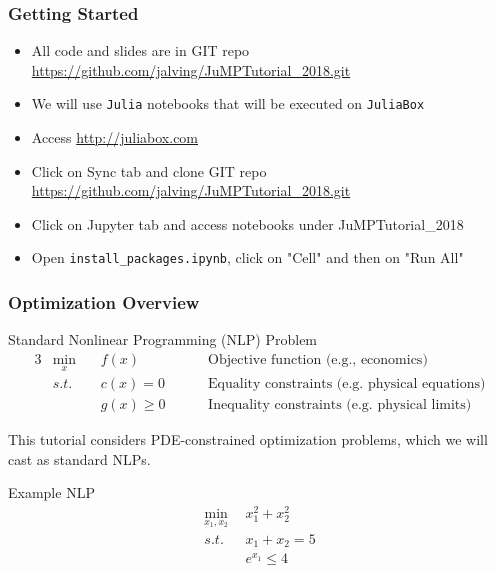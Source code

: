 


\begin{frame}[t,fragile]  %
  \frametitle{Getting Started}
  \begin{itemize}
  \item All code and slides are in GIT repo \url{https://github.com/jalving/JuMPTutorial_2018.git}
    \item We will use {\tt Julia} notebooks that will be executed on {\tt JuliaBox}
    \item Access \url{http://juliabox.com}
    \item Click on Sync tab and clone GIT repo \url{https://github.com/jalving/JuMPTutorial_2018.git}
    \item Click on Jupyter tab and access notebooks under JuMPTutorial_2018
    \item Open  {\tt install_packages.ipynb}, click on "Cell" and then on "Run All"
  \end{itemize}
\end{frame}

\begin{frame}
    \frametitle{Optimization Overview}
    \begin{block}{Standard Nonlinear Programming (NLP) Problem}
    \begin{alignat*}{3}
        &\min_x &&f(x)  &&\quad\text{Objective function (e.g., economics)}\\
        &s.t.\ \ &&c(x) = 0\ \  &&\quad\text{Equality constraints (e.g. physical equations)} \\
        & &&g(x) \ge 0 \ \ &&\quad\text{Inequality constraints (e.g. physical limits)}
    \end{alignat*}
    \end{block}
    This tutorial considers PDE-constrained optimization problems, which we will cast as standard NLPs.
    \begin{exampleblock}{Example NLP}
        \vspace{-0.5cm}
        \begin{align*}
            \min_{x_1,x_2} \ \ &x_1^2 + x_2^2\\
            s.t. \ \ &x_1 + x_2 = 5\\
            &e^{x_1} \le 4\\
        \end{align*}
        \vspace{-1.2cm}
    \end{exampleblock}
\end{frame}

